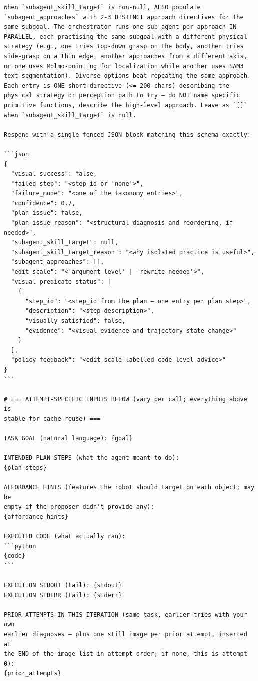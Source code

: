 \begin{lstlisting}[style=ratsappendixprompt]
When `subagent_skill_target` is non-null, ALSO populate
`subagent_approaches` with 2-3 DISTINCT approach directives for the
same subgoal. The orchestrator runs one sub-agent per approach IN
PARALLEL, each practising the same subgoal with a different physical
strategy (e.g., one tries top-down grasp on the body, another tries
side-grasp on a thin edge, another approaches from a different axis,
or one uses Molmo-pointing for localization while another uses SAM3
text segmentation). Diverse options beat repeating the same approach.
Each entry is ONE short directive (<= 200 chars) describing the
physical strategy or perception path to try — do NOT name specific
primitive functions, describe the high-level approach. Leave as `[]`
when `subagent_skill_target` is null.

Respond with a single fenced JSON block matching this schema exactly:

```json
{
  "visual_success": false,
  "failed_step": "<step_id or 'none'>",
  "failure_mode": "<one of the taxonomy entries>",
  "confidence": 0.7,
  "plan_issue": false,
  "plan_issue_reason": "<structural diagnosis and reordering, if needed>",
  "subagent_skill_target": null,
  "subagent_skill_target_reason": "<why isolated practice is useful>",
  "subagent_approaches": [],
  "edit_scale": "<'argument_level' | 'rewrite_needed'>",
  "visual_predicate_status": [
    {
      "step_id": "<step_id from the plan — one entry per plan step>",
      "description": "<step description>",
      "visually_satisfied": false,
      "evidence": "<visual evidence and trajectory state change>"
    }
  ],
  "policy_feedback": "<edit-scale-labelled code-level advice>"
}
```

# === ATTEMPT-SPECIFIC INPUTS BELOW (vary per call; everything above is
stable for cache reuse) ===

TASK GOAL (natural language): {goal}

INTENDED PLAN STEPS (what the agent meant to do):
{plan_steps}

AFFORDANCE HINTS (features the robot should target on each object; may be
empty if the proposer didn't provide any):
{affordance_hints}

EXECUTED CODE (what actually ran):
```python
{code}
```

EXECUTION STDOUT (tail): {stdout}
EXECUTION STDERR (tail): {stderr}

PRIOR ATTEMPTS IN THIS ITERATION (same task, earlier tries with your own
earlier diagnoses — plus one still image per prior attempt, inserted at
the END of the image list in attempt order; if none, this is attempt 0):
{prior_attempts}
\end{lstlisting}


